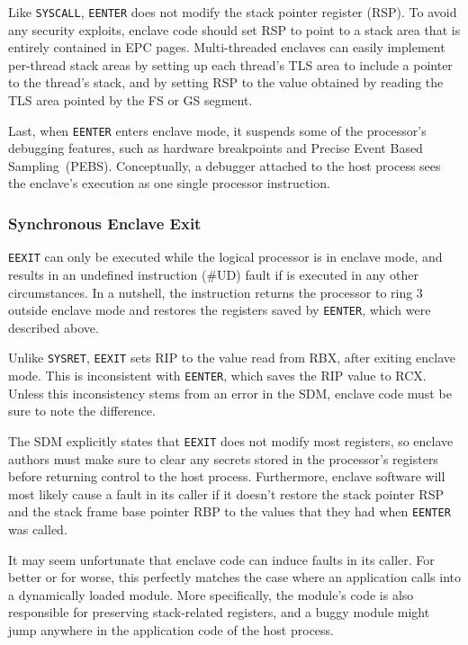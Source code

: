 Like \texttt{SYSCALL}, \texttt{EENTER} does not modify the stack pointer
register (RSP). To avoid any security exploits, enclave code should set RSP to
point to a stack area that is entirely contained in EPC pages. Multi-threaded
enclaves can easily implement per-thread stack areas by setting up each
thread's TLS area to include a pointer to the thread's stack, and by setting
RSP to the value obtained by reading the TLS area pointed by the FS or GS
segment.

Last, when \texttt{EENTER} enters enclave mode, it suspends some of the
processor's debugging features, such as hardware breakpoints and Precise Event
Based Sampling~(PEBS). Conceptually, a debugger attached to the host process
sees the enclave's execution as one single processor instruction.


\subsubsection{Synchronous Enclave Exit}
\label{sec:sgx_eexit}


\texttt{EEXIT} can only be executed while the logical processor is in enclave
mode, and results in an undefined instruction (\#UD) fault if is executed in
any other circumstances. In a nutshell, the instruction returns the processor
to ring 3 outside enclave mode and restores the registers saved by
\texttt{EENTER}, which were described above.

Unlike \texttt{SYSRET}, \texttt{EEXIT} sets RIP to the value read from RBX,
after exiting enclave mode. This is inconsistent with \texttt{EENTER}, which
saves the RIP value to RCX. Unless this inconsistency stems from an error in
the SDM, enclave code must be sure to note the difference.

The SDM explicitly states that \texttt{EEXIT} does not modify most registers,
so enclave authors must make sure to clear any secrets stored in the
processor's registers before returning control to the host process.
Furthermore, enclave software will most likely cause a fault in its caller if
it doesn't restore the stack pointer RSP and the stack frame base pointer RBP
to the values that they had when \texttt{EENTER} was called.

It may seem unfortunate that enclave code can induce faults in its caller.
For better or for worse, this perfectly matches the case where an application
calls into a dynamically loaded module. More specifically, the module's code is
also responsible for preserving stack-related registers, and a buggy module
might jump anywhere in the application code of the host process.

